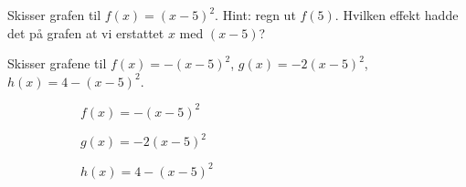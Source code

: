 \documentclass[a4paper,11pt]{article}
\begin{document}

\begin{subproblem}
    Skisser grafen til $f(x) = (x - 5)^2$. Hint: regn ut $f(5)$.
    Hvilken effekt hadde det på grafen at vi erstattet $x$ med $(x - 5)$?
\end{subproblem}

\begin{subproblem}
    Skisser grafene til $f(x) = -(x-5)^2$, $g(x)=-2(x-5)^2$, $h(x) = 4 - (x-5)^2$.
\end{subproblem}

\begin{figure}
    \centering
    \begin{subfigure}[b]{0.3\textwidth}
        \centering
        \caption{$f(x) = -(x - 5)^2$}
        \label{subfig:MAT-0001-Problem-2-3-3-e-i}
    \end{subfigure}
    \hfill %
    \begin{subfigure}[b]{0.3\textwidth}
        \centering
        \caption{$g(x) = -2(x - 5)^2$}
        \label{subfig:MAT-0001-Problem-2-3-3-e-ii}
    \end{subfigure}
    \hfill %
    \begin{subfigure}[b]{0.3\textwidth}
        \centering
        \caption{$h(x) = 4-(x - 5)^2$}
        \label{subfig:MAT-0001-Problem-2-3-3-e-iii}
    \end{subfigure}
    \caption{}\label{fig:MAT-0001-Problem-2-3-3-e}
\end{figure}
\end{document}
